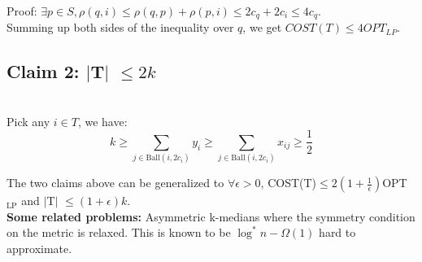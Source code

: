 \noindent Proof: $\exists p \in S, \rho(q, i) \leq \rho(q,p)+\rho(p, i)\leq 2c_q+2c_i \leq 4c_q$. \\

\noindent Summing up both sides of the inequality over $q$, we get $COST(T) \leq 4 OPT_{LP}$.

\subsection*{Claim 2: $\mid$T$\mid$ $\leq 2k$} ~\\

Pick any $i \in T$, we have:
$$k \geq \sum_{j \in \text{Ball}(i, 2c_i)}y_i \geq \sum_{j \in \text{Ball}(i, 2c_i)}x_{ij} \geq \frac{1}{2}$$

\noindent The two claims above can be generalized to $\forall \epsilon > 0$, COST(T)$\leq2(1+\frac{1}{\epsilon})$OPT$_\text{LP}$ and $\mid $T$\mid$ $\leq (1+\epsilon)k$. \\

\noindent\textbf{Some related problems:} Asymmetric k-medians where the symmetry condition on the metric is relaxed. This is known to be $\log^*n - \Omega(1)$ hard to approximate.
